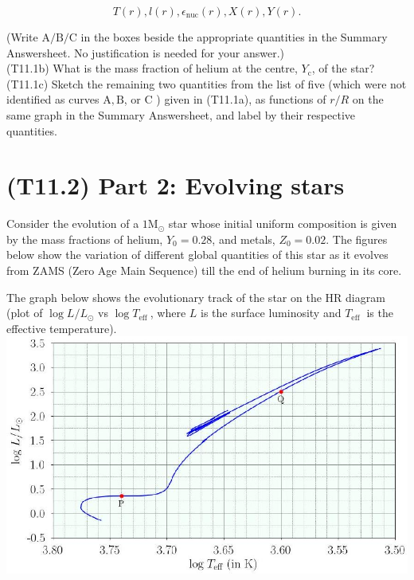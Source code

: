 \documentclass[10pt]{article}
\begin{document}
    $$
    T(r), l(r), \epsilon_{\mathrm{nuc}}(r), X(r), Y(r) .
    $$
    
    (Write $\mathrm{A} / \mathrm{B} / \mathrm{C}$ in the boxes beside the appropriate quantities in the Summary Answersheet. No justification is needed for your answer.)\\
    (T11.1b) What is the mass fraction of helium at the centre, $Y_{\mathrm{c}}$, of the star?\\
    (T11.1c) Sketch the remaining two quantities from the list of five (which were not identified as curves $\mathrm{A}, \mathrm{B}$, or C ) given in (T11.1a), as functions of $r / R$ on the same graph in the Summary Answersheet, and label by their respective quantities.
    
    \section*{(T11.2) Part 2: Evolving stars}
    Consider the evolution of a $1 \mathrm{M}_{\odot}$ star whose initial uniform composition is given by the mass fractions of helium, $Y_{0}=0.28$, and metals, $Z_{0}=0.02$. The figures below show the variation of different global quantities of this star as it evolves from ZAMS (Zero Age Main Sequence) till the end of helium burning in its core.
    
    The graph below shows the evolutionary track of the star on the HR diagram (plot of $\log L / L_{\odot}$ vs $\log T_{\text {eff }}$, where $L$ is the surface luminosity and $T_{\text {eff }}$ is the effective temperature).\\
    \includegraphics[max width=\textwidth, center]{2025_08_23_e94579452776a99c4850g-14}
    
\end{document}

